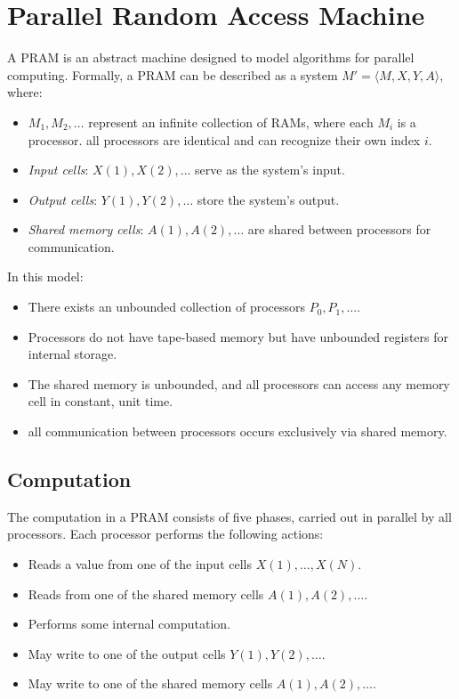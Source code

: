 \section{Parallel Random Access Machine}

\begin{definition}
    A PRAM is an abstract machine designed to model algorithms for parallel computing. 
    Formally, a PRAM can be described as a system $M' = \langle M, X, Y, A \rangle$, where:
\end{definition}
\begin{itemize}
    \item $M_1, M_2, \dots$ represent an infinite collection of RAMs, where each $M_i$ is a processor. 
        all processors are identical and can recognize their own index $i$.
    \item \textit{Input cells}: $X(1), X(2), \dots$ serve as the system's input.
    \item \textit{Output cells}: $Y(1), Y(2), \dots$ store the system's output.
    \item \textit{Shared memory cells}: $A(1), A(2), \dots$ are shared between processors for communication.
\end{itemize}
In this model:
\begin{itemize}
\item There exists an unbounded collection of processors $P_0, P_1, \dots$.
\item Processors do not have tape-based memory but have unbounded registers for internal storage.
\item The shared memory is unbounded, and all processors can access any memory cell in constant, unit time.
\item all communication between processors occurs exclusively via shared memory.
\end{itemize}

\subsection{Computation}
The computation in a PRAM consists of five phases, carried out in parallel by all processors. Each processor performs the following actions:
\begin{itemize}
    \item Reads a value from one of the input cells $X(1), \dots, X(N)$.
    \item Reads from one of the shared memory cells $A(1), A(2), \dots$.
    \item Performs some internal computation.
    \item May write to one of the output cells $Y(1), Y(2), \dots$.
    \item May write to one of the shared memory cells $A(1), A(2), \dots$.
\end{itemize}

